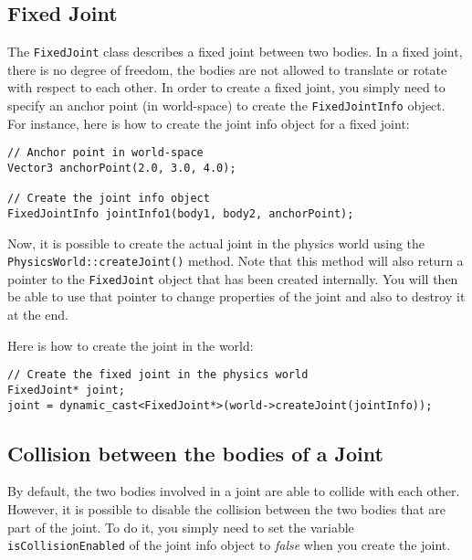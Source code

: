 \documentclass[a4paper,12pt]{article}
\begin{document}
    \subsection{Fixed Joint}

    The \texttt{FixedJoint} class describes a fixed joint between two bodies. In a fixed joint, there is no degree of freedom, the bodies are not allowed to translate
    or rotate with respect to each other. In order to create a fixed joint, you simply need to specify an anchor point (in world-space) to create the \texttt{FixedJointInfo}
    object. \\

    For instance, here is how to create the joint info object for a fixed joint: \\

    \begin{lstlisting}
// Anchor point in world-space
Vector3 anchorPoint(2.0, 3.0, 4.0);

// Create the joint info object
FixedJointInfo jointInfo1(body1, body2, anchorPoint);
  \end{lstlisting}

    \vspace{0.6cm}

    \begin{sloppypar}
    Now, it is possible to create the actual joint in the physics world using the \texttt{PhysicsWorld::createJoint()} method.
    Note that this method will also return a pointer to the \texttt{FixedJoint} object that has been created internally. You will then
    be able to use that pointer to change properties of the joint and also to destroy it at the end. \\
    \end{sloppypar}

    Here is how to create the joint in the world: \\

    \begin{lstlisting}
// Create the fixed joint in the physics world
FixedJoint* joint;
joint = dynamic_cast<FixedJoint*>(world->createJoint(jointInfo));
  \end{lstlisting}

    \subsection{Collision between the bodies of a Joint}

    By default, the two bodies involved in a joint are able to collide with each other. However, it is possible to disable the collision between the two bodies that are part
    of the joint. To do it, you simply need to set the variable \texttt{isCollisionEnabled} of the joint info object to \emph{false} when you create the joint. \\
\end{document}
